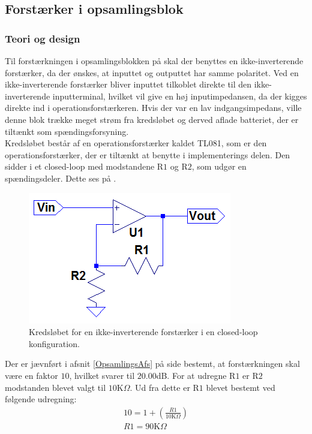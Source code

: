 \subsection{Forstærker i opsamlingsblok}\label{Subsec:Forstaerker}
\subsubsection{Teori og design}
Til forstærkningen i opsamlingsblokken på  skal der benyttes en ikke-inverterende forstærker, da der ønskes, at inputtet og outputtet har samme polaritet. Ved en ikke-inverterende forstærker bliver inputtet tilkoblet direkte til den ikke-inverterende inputterminal, hvilket vil give en høj inputimpedansen, da der kigges direkte ind i operationsforstærkeren. Hvis der var en lav indgangsimpedans, ville denne blok trække meget strøm fra kredsløbet og derved aflade batteriet, der er tiltænkt som spændingsforsyning. \\
Kredsløbet består af en operationsforstærker kaldet TL081, som er den operationsforstærker, der er tiltænkt at benytte i implementerings delen. Den sidder i et closed-loop med modstandene R$1$ og R$2$, som udgør en spændingsdeler. Dette ses på .
\begin{figure}[H]
\centering
\includegraphics[scale=0.85]{figures/cProblemloesning/Forstaerker.PNG}
\caption{Kredsløbet for en ikke-inverterende forstærker i en closed-loop konfiguration.}
\label{fig:Forstaerker}
\end{figure} 

\noindent Der er jævnført i afsnit \ref{OpsamlingsAfs} på side \pageref{OpsamlingsAfs} bestemt, at forstærkningen skal være en faktor $10$, hvilket svarer til $20.00$dB. For at udregne R$1$ er R$2$ modstanden blevet valgt til $10$K$\Omega$. Ud fra dette er R$1$ blevet bestemt ved følgende udregning:
\begin{align}
10 = 1 + (\frac{R1}{10\text{K}\Omega})\\
R1 = 90\text{K}\Omega
\end{align}

